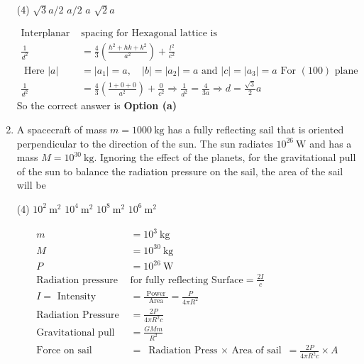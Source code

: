 \begin{enumerate}
 \begin{tasks}(4)
	\task[\textbf{a.}] $\sqrt{3} a / 2$
	\task[\textbf{b.}]$a / 2$
	\task[\textbf{c.}] $a$
	\task[\textbf{d.}] $\sqrt{2} a$
\end{tasks}
\begin{answer}
	\begin{align*}
	\text{Interplanar  }&\text{spacing for Hexagonal lattice is}\\
	\frac{1}{d^{2}}&=\frac{4}{3}\left(\frac{h^{2}+h k+k^{2}}{a^{2}}\right)+\frac{l^{2}}{c^{2}}\\
\text{	Here }|a|&=\left|a_{1}\right|=a, \quad|b|=\left|a_{2}\right|=a\text{ and }|c|=\left|a_{3}\right|=a\text{ For $(100)$ plane}\\
	\frac{1}{d^{2}}&=\frac{4}{3}\left(\frac{1+0+0}{a^{2}}\right)+\frac{0}{c^{2}} \Rightarrow \frac{1}{d^{2}}=\frac{4}{3 a} \Rightarrow d=\frac{\sqrt{3}}{2} a
	\end{align*}
	So the correct answer is \textbf{Option (a)}
\end{answer}
\item  A spacecraft of mass $m=1000 \mathrm{~kg}$ has a fully reflecting sail that is oriented perpendicular to the direction of the sun. The sun radiates $10^{26} \mathrm{~W}$ and has a mass $M=10^{30} \mathrm{~kg}$. Ignoring the effect of the planets, for the gravitational pull of the sun to balance the radiation pressure on the sail, the area of the sail will be
 \begin{tasks}(4)
	\task[\textbf{a.}]$10^{2} \mathrm{~m}^{2}$
	\task[\textbf{b.}]$10^{4} \mathrm{~m}^{2}$
	\task[\textbf{c.}]$10^{8} \mathrm{~m}^{2}$
	\task[\textbf{d.}] $10^{6} \mathrm{~m}^{2}$
\end{tasks}
\begin{answer}
	\begin{align*}
	m&=10^{3} \mathrm{~kg}\\
	M&=10^{30} \mathrm{~kg} \\
	P&=10^{26} \mathrm{~W}\\
	\text{Radiation pressure  }&\text{for fully reflecting Surface}=\frac{2 I}{c}\\
	I=\text { Intensity }&=\frac{\text { Power }}{\text { Area }}=\frac{P}{4 \pi R^{2}}\\
	\text{Radiation Pressure }&=\frac{2 P}{4 \pi R^{2} c}\\
	\text{Gravitational pull }&=\frac{G M m}{R^{2}}\\
	\text{Force on sail }&=\text{ Radiation Press $\times$ Area of sail }=\frac{2 P}{4 \pi R^{2} c} \times A\\

\end{align*}
\end{answer}
\end{enumerate}
